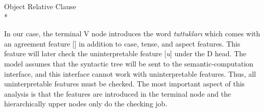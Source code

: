 \ea \label{syntax:orcRepeat} {Object Relative Clause}\\*
\z

In our case, the terminal V node introduces the word \emph{tuttuklar{\i}} which comes with an agreement feature [\Tpl{}] in addition to case, tense, and aspect features. This feature will later check the uninterpretable feature [\emph{u}\Tpl{}] under the D head. The model assumes that the syntactic tree will be sent to the semantic-computation interface, and this interface cannot work with uninterpretable features. Thus, all uninterpretable features must be checked. The most important aspect of this analysis is that the features are introduced in the terminal node and the hierarchically upper nodes only do the checking job. 

